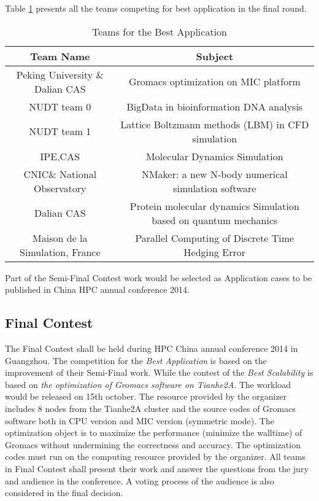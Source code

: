 Table \ref{tab:bestApp} presents all the teams competing for best application in the final round. 
\begin{table}[htbp]
\centering
\caption{Teams for the Best Application}
\label{tab:bestApp}
\begin{tabular}{|c|c|}
\hline
Team Name & Subject \\
\hline
Peking University \& Dalian CAS & Gromacs optimization on MIC platform \\
\hline
NUDT team 0 & BigData in bioinformation DNA analysis \\
\hline
NUDT team 1 & Lattice Boltzmann methods (LBM) in CFD simulation \\
\hline
IPE,CAS & Molecular Dynamics Simulation \\
\hline
CNIC\& National Observatory & NMaker: a new N-body numerical simulation software \\
\hline
Dalian CAS & Protein molecular dynamics Simulation based on quantum mechanics \\
\hline
Maison de la Simulation, France &  Parallel Computing of Discrete Time Hedging Error\\
\hline
\end{tabular}
\end{table}

Part of the Semi-Final Contest work would be selected as Application cases to be published in China HPC annual conference 2014. 


\subsection{Final Contest} %
\label{sub:Final}
The Final Contest shall be held during HPC China annual conference 2014 in Guangzhou. The competition for the \textsl{Best Application} 
is based on the improvement of their Semi-Final work. While the contest of the \textsl{Best Scalability} is based on \textsl{the optimization of Gromacs software on Tianhe2A}.
The workload would be released on 15th october. 
The resource provided by the organizer includes 8 nodes from the 
Tianhe2A cluster and the source codes of Gromacs software both in CPU version and MIC version (symmetric mode).
The optimization object is to maximize the performance (minimize the walltime) of Gromacs without undermining the correctness and accuracy. 
The optimization codes must run on the computing resource provided by the organizer. 
All teams in Final Contest shall present their work and answer the questions from the jury and audience in the conference. A voting process of 
the audience is also considered in the final decision. 

